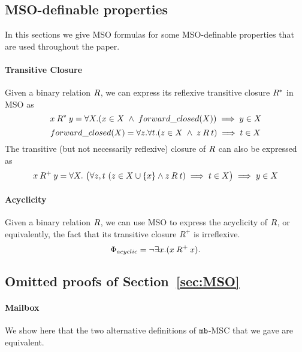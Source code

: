 
\subsection{MSO-definable properties}

In this sections we give MSO formulas for some MSO-definable properties that are used throughout the paper.

\paragraph*{Transitive Closure}
Given a binary relation $\mathbin{R}$, we can express its reflexive transitive closure $\mathbin{R}^*$ in MSO as
\[
x \mathbin{R}^* y = \forall X.(x \in X \;\wedge\; forward\_closed(X)) \implies y \in X
\]
\[
forward\_closed(X) = \forall z.\forall t.(z \in X \;\wedge\; z \mathbin{R} t) \implies t \in X
\]
The transitive (but not necessarily reflexive) 
closure of $\mathbin{R}$ can also be expressed as
\[
    x \mathbin{R}^+ y = \forall X.\ \big(
        \forall z,t\ (z\in X\cup\{x\}\wedge z \mathbin{R} t)\implies t \in X\big) \implies y\in X
\]
        
\paragraph*{Acyclicity} 

Given a binary relation $\mathbin{R}$, we can use MSO to express the 
acyclicity of $\mathbin{R}$,
or equivalently, the fact that its transitive closure
$R^+$ is irreflexive.
\[
\Phi_{acyclic} =  \neg \exists x.(x \mathbin{R}^+ x).   
\]

\subsection{Omitted proofs of Section~\ref{sec:MSO}}

\paragraph*{\bf Mailbox}

We show here that the two alternative definitions of $\mathtt{mb}$-MSC that we gave are equivalent.

